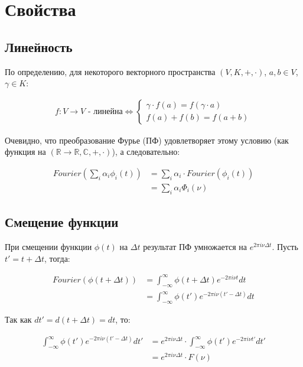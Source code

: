 \documentclass[10pt,a4paper,oneside]{article}
\begin{document}
\section{Свойства}
\subsection{Линейность}
    
По определению, для некоторого векторного пространства $(V,K,+,\cdot)$, $a,b \in V$, $\gamma \in K$:

\[
    \begin{aligned}
        f: V \rightarrow V \text{ - линейна}
        \Longleftrightarrow
        \begin{cases}
                \gamma\cdot f(a) = f(\gamma\cdot a) \\
                f(a) + f(b) = f(a + b)
        \end{cases}
    \end{aligned}
\]
    
Очевидно, что преобразование Фурье (ПФ) удовлетворяет этому условию (как функция на $(\mathbb{R} \rightarrow \mathbb{R},\mathbb{C},+,\cdot)$), а следовательно:

\[
    \begin{aligned}
        Fourier\left(\sum_{i}\alpha_i\phi_i(t)\right)
        &= \sum_{i}\alpha_i \cdot Fourier(\phi_i(t)) \\
        &= \sum_{i}\alpha_i \Phi_i(\nu)
    \end{aligned}
\]

\subsection{Смещение функции}

При смещении функции $\phi(t)$ на $\Delta t$ результат ПФ умножается на $e^{2\pi i \nu\Delta t}$. Пусть $t' = t + \Delta t$, тогда:

\[
    \begin{aligned}
        Fourier\left(\phi(t + \Delta t)\right)
        &= \int_{-\infty}^{\infty} \phi(t + \Delta t) e^{-2\pi i\nu t} dt \\
        &= \int_{-\infty}^{\infty} \phi(t') e^{-2\pi i\nu (t' - \Delta t)} dt
    \end{aligned}
\]

Так как $dt' = d(t + \Delta t) = dt$, то:

\[
    \begin{aligned}
        \int_{-\infty}^{\infty} \phi(t') e^{-2\pi i\nu (t' - \Delta t)} dt'
        &= e^{2\pi i\nu\Delta t} \cdot \int_{-\infty}^{\infty} \phi(t') e^{-2\pi i\nu t'} dt' \\
        &= e^{2\pi i\nu\Delta t} \cdot F(\nu)
    \end{aligned}
\]
\end{document}
